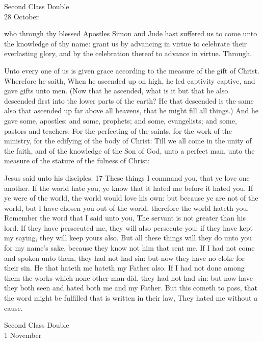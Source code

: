 \begin{inhead}
    {Second Class Double\\
28 October}
\end{inhead}

\collect
{} who through thy blessed Apostles Simon and Jude hast suffered us to come unto the knowledge of thy name: grant us by advancing in virtue to celebrate their everlasting glory, and by the celebration thereof to advance in virtue. Through.

 Unto every one of us is given grace according to the measure of the gift of Christ. Wherefore he saith, When he ascended up on high, he led captivity captive, and gave gifts unto men. (Now that he ascended, what is it but that he also descended first into the lower parts of the earth? He that descended is the same also that ascended up far above all heavens, that he might fill all things.) And he gave some, apostles; and some, prophets; and some, evangelists; and some, pastors and teachers; For the perfecting of the saints, for the work of the ministry, for the edifying of the body of Christ: Till we all come in the unity of the faith, and of the knowledge of the Son of God, unto a perfect man, unto the measure of the stature of the fulness of Christ:

 Jesus said unto his disciples: 17 These things I command you, that ye love one another. If the world hate you, ye know that it hated me before it hated you. If ye were of the world, the world would love his own: but because ye are not of the world, but I have chosen you out of the world, therefore the world hateth you. Remember the word that I said unto you, The servant is not greater than his lord. If they have persecuted me, they will also persecute you; if they have kept my saying, they will keep yours also. But all these things will they do unto you for my name's sake, because they know not him that sent me. If I had not come and spoken unto them, they had not had sin: but now they have no cloke for their sin. He that hateth me hateth my Father also. If I had not done among them the works which none other man did, they had not had sin: but now have they both seen and hated both me and my Father. But this cometh to pass, that the word might be fulfilled that is written in their law, They hated me without a cause.

\begin{inhead}
    {Second Class Double\\
1 November}
\end{inhead}

